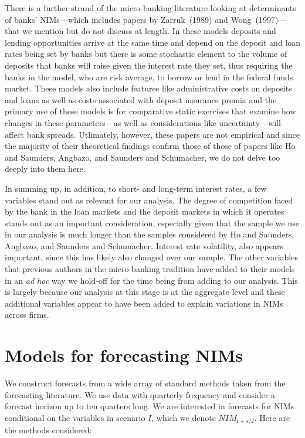 \documentclass[11pt]{article}
\begin{document}
There is a further strand of the micro-banking literature looking at determinants of banks' NIMs---which includes papers by Zarruk~(1989) and Wong~(1997)---that we mention but do not discuss at length.  In these models deposits and lending opportunities arrive at the same time and depend on the deposit and loan rates being set by banks but there is some stochastic element to the volume of deposits that banks will raise given the interest rate they set, thus requiring the banks in the model, who are risk average, to borrow or lend in the federal funds market.  These models also include features like administrative costs on deposits and loans as well as costs associated with deposit insurance premia and the primary use of these models is for comparative static exercises that examine how changes in these parameters---as well as considerations like uncertainty---will affect bank spreads.  Utlimately, however, these papers are not empirical and since the majority of their theoretical findings confirm those of those of papers like Ho and Saunders, Angbazo, and Saunders and Schumacher, we do not delve too deeply into them here.

In summing up, in addition, to short- and long-term interest rates, a few variables stand out as relevant for our analysis.  The degree of competition faced by the bank in the loan markets and the deposit markets in which it operates stands out as an important consideration, especially given that the sample we use in our analysis is much longer than the samples considered by Ho and Saunders, Angbazo, and Saunders and Schumacher.  Interest rate volatility, also appears important, since this has likely also changed over our sample.  The other variables that previous authors in the micro-banking tradition have added to their models in an \textit{ad hoc} way we hold-off for the time being from adding to our analysis.  This is largely because our analysis at this stage is at the aggregate level and these additional variables appear to have been added to explain variations in NIMs across firms.

\section{Models for forecasting NIMs}

We construct forecasts from a wide array of standard methods taken from the forecasting literature. We use data with quarterly frequency and consider a forecast horizon up to ten quarters long. We are interested in forecasts for NIMs conditional on the variables in scenario $I$, which we denote $NIM_{t+s/I}$. Here are the methods considered:
\end{document}
